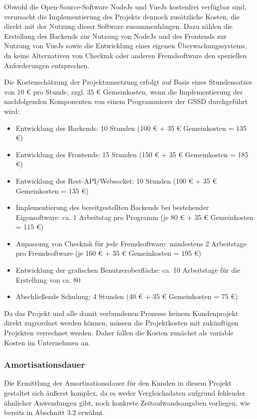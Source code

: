 \begin{flushleft}
Obwohl die Open-Source-Software NodeJs und VueJs kostenfrei verfügbar sind, verursacht die Implementierung des Projekts dennoch zusätzliche Kosten, die direkt mit der Nutzung dieser Software zusammenhängen. Dazu zählen die Erstellung des Backends zur Nutzung von NodeJs und des Frontends zur Nutzung von VueJs sowie die Entwicklung eines eigenen Überwachungssystems, da keine Alternativen von Checkmk oder anderen Fremdsoftware den speziellen Anforderungen entsprechen.

Die Kostenschätzung der Projektumsetzung erfolgt auf Basis eines Stundensatzes von 10 € pro Stunde, zzgl. 35 € Gemeinkosten, wenn die Implementierung der nachfolgenden Komponenten von einem Programmierer der GSSD durchgeführt wird:

\begin{itemize}
\item Entwicklung des Backends: 10 Stunden (100 € + 35 € Gemeinkosten = 135 €)
\item Entwicklung des Frontends: 15 Stunden (150 € + 35 € Gemeinkosten = 185 €)
\item Entwicklung des Rest-API/Websocket: 10 Stunden (100 € + 35 € Gemeinkosten = 135 €)
\item Implementierung des bereitgestellten Backends bei bestehender Eigensoftware: ca. 1 Arbeitstag pro Programm (je 80 € + 35 € Gemeinkosten = 115 €)
\item Anpassung von Checkmk für jede Fremdsoftware: mindestens 2 Arbeitstage pro Fremdsoftware (je 160 € + 35 € Gemeinkosten = 195 €)
\item Entwicklung der grafischen Benutzeroberfläche: ca. 10 Arbeitstage für die Erstellung von ca. 80 %
\item Abschließende Schulung: 4 Stunden (40 € + 35 € Gemeinkosten = 75 €)
\end{itemize}

Da das Projekt und alle damit verbundenen Prozesse keinem Kundenprojekt direkt zugeordnet werden können, müssen die Projektkosten mit zukünftigen Projekten verrechnet werden. Daher fallen die Kosten zunächst als variable Kosten im Unternehmen an.

\subsubsection{Amortisationsdauer}
Die Ermittlung der Amortisationsdauer für den Kunden in diesem Projekt gestaltet sich äußerst komplex, da es weder Vergleichsdaten aufgrund fehlender ähnlicher Anwendungen gibt, noch konkrete Zeitaufwandsangaben vorliegen, wie bereits in Abschnitt 3.2 erwähnt.


\end{flushleft}
